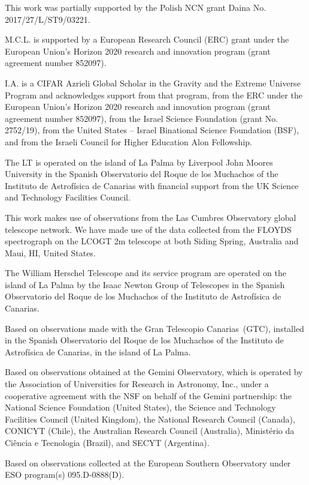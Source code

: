 \documentclass[linenumbers, twocolumn]{aastex631}
\begin{document}
This work was partially supported by the Polish NCN grant Daina
No. 2017/27/L/ST9/03221.

M.C.L. is supported by a European Research Council (ERC) grant under the European Union's Horizon 2020 research and innovation program (grant agreement number 852097).

I.A. is a CIFAR Azrieli Global Scholar in the Gravity and the Extreme Universe Program and acknowledges support from that program, from the ERC under the European Union's Horizon 2020 research and innovation program (grant agreement number 852097), from the Israel Science Foundation (grant No. 2752/19), from the United States -- Israel Binational Science Foundation (BSF), and from the Israeli Council for Higher Education Alon Fellowship.

The LT is operated on the island of La Palma by Liverpool
John Moores University in the Spanish Observatorio del Roque
de los Muchachos of the Instituto de Astrof{\'i}sica de Canarias with
financial support from the UK Science and Technology Facilities
Council.

This work makes use of observations from the Las Cumbres Observatory
global telescope network. We have made use of the data collected from
the FLOYDS spectrograph on the LCOGT 2m telescope at both Siding Spring,
Australia and Maui, HI, United States.

The William Herschel Telescope and its service program are operated
on the island of La Palma by the Isaac Newton Group of Telescopes in
the Spanish Observatorio del Roque de los Muchachos of the Instituto
de Astrof\'isica de Canarias.

Based on observations made with the Gran Telescopio Canarias~(GTC), installed 
in the Spanish Observatorio del Roque de los Muchachos of the Instituto de 
Astrof\'isica de Canarias, in the island of La Palma.

Based on observations obtained at the Gemini Observatory, which is operated by the
Association of Universities for Research in Astronomy, Inc., under a cooperative agreement
with the NSF on behalf of the Gemini partnership: the National Science Foundation (United
States), the Science and Technology Facilities Council (United Kingdom), the
National Research Council (Canada), CONICYT (Chile), the Australian Research Council
(Australia), Ministério da Ciência e Tecnologia (Brazil), and SECYT (Argentina).

Based on observations collected at the European Southern Observatory under ESO program(s) 095.D-0888(D).
\end{document}
